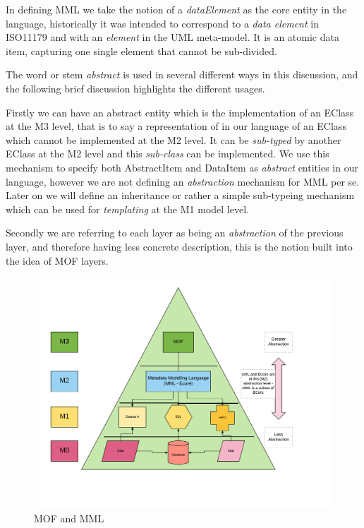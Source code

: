 \documentclass{llncs}
\begin{document}
In defining MML we take the notion of a \emph{dataElement} as the core entity in the language, historically it was intended to correspond to a \emph{data element} in ISO11179 and with an \emph{element} in the UML meta-model. It is an atomic data item, capturing one single element that cannot be sub-divided.

The word or stem \emph{abstract} is used in several different ways in this discussion, and the following brief discussion highlights the different usages.  

Firstly we can have an abstract entity which is the implementation of an EClass at the M3 level, that is to say a representation of in our language of an EClass which cannot be implemented at the M2 level. It can be \emph{sub-typed} by another EClass at the M2 level and this \emph{sub-class} can be implemented. We use this mechanism to specify both AbstractItem and DataItem as \emph{abstract} entities in our language, however we are not defining an \emph{abstraction} mechanism for MML per se. Later on we will define an inheritance or rather a simple sub-typeing mechanism which can be used for \emph{templating} at the M1 model level. 

Secondly we are referring to each layer as being an \emph{abstraction} of the previous layer, and therefore having less concrete description, this is the notion built into the idea of MOF layers. 

\begin{figure}
	\centering
	\includegraphics[scale=0.45]{figures/MMLMOFModel}
	\caption{MOF and MML}
	\label{fig:mofmml}
\end{figure}
\end{document}
